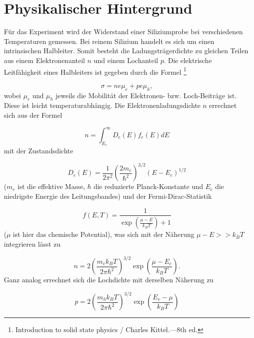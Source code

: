 \documentclass[a4paper,parskip,11pt, DIV12]{scrreprt}
\newcommand{\footnoteremember}[2]{
  \footnote{#2}
  \newcounter{#1}
  \setcounter{#1}{\value{footnote}}
}
\newcommand{\footnoterecall}[1]{%
  \footnotemark[\value{#1}]
}
\begin{document}

\tableofcontents

\chapter{Physikalischer Hintergrund}
\label{ch:Physik}

Für das Experiment wird der Widerstand einer Siliziumprobe bei verschiedenen Temperaturen gemessen. Bei reinem Silizium handelt es sich um einen intrinsischen Halbleiter. Somit besteht die Ladungsträgerdichte zu gleichen Teilen aus einem Elektronenanteil $n$ und einem Lochanteil $p$.
Die elektrische Leitfähigkeit eines Halbleiters ist gegeben durch die Formel\footnoteremember{kittel}{Introduction to solid state physics / Charles Kittel.—8th ed.}
\begin{equation}
\label{eq:sigma}
\sigma = ne\mu_e + pe\mu_h ,
\end{equation}
wobei $\mu_e$ und $\mu_h$ jeweils die Mobilität der Elektronen- bzw. Loch-Beiträge ist. Diese ist leicht temperaturabhängig. Die Elektronenladungsdichte $n$ errechnet sich aus der Formel\footnoterecall{kittel}
\begin{equation}
n = \int_{E_c}^{\infty} D_e(E) f_e(E) dE 
\end{equation}
mit der Zustandsdichte\footnoterecall{kittel}
\begin{equation}
D_e(E) = \frac{1}{2 \pi^2} \left(\frac{2 m_e}{\hbar^2}\right)^{3/2} (E - E_c)^{1/2}
\end{equation}
($m_e$ ist die effektive Masse, $\hbar$ die reduzierte Planck-Konstante und $E_c$ die niedrigste Energie des Leitungsbandes) und der Fermi-Dirac-Statistik\footnoterecall{kittel}
\begin{equation}
f(E,T) = \frac{1}{\exp \left(\frac{\mu - E}{k_B T}\right) + 1}
\end{equation}
($\mu$ ist hier das chemische Potential), was sich mit der Näherung $\mu - E >> k_B T$ integrieren lässt zu\footnoterecall{kittel}
\begin{equation}
n = 2 \left(\frac{m_e k_B T}{2 \pi \hbar^2}\right)^{3/2} \exp \left(\frac{\mu - E_c}{k_B T}\right).
\end{equation}
Ganz analog errechnet sich die Lochdichte mit derselben Näherung zu\footnoterecall{kittel}
\begin{equation}
p = 2 \left(\frac{m_h k_B T}{2 \pi \hbar^2}\right)^{3/2} \exp \left(\frac{E_v - \mu}{k_B T}\right)
\end{equation}
\end{document}
